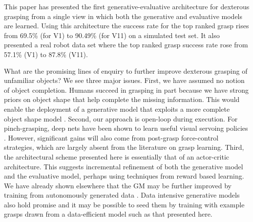 This paper has presented the first generative-evaluative architecture for dexterous grasping from a single view in which both the generative and evaluative models are learned. Using this architecture the success rate for the top ranked grasp rises from 69.5\% (for V1) to 90.49\% (for V11) on a simulated test set. It also presented a real robot data set where the top ranked grasp success rate rose from 57.1\% (V1) to 87.8\% (V11).

What are the promising lines of enquiry to further improve dexterous grasping of unfamiliar objects? We see three major issues. First, we have assumed no notion of object completion. Humans succeed in grasping in part because we have strong priors on object shape that help complete the missing information. This would enable the deployment of a generative model that exploits a more complete object shape model \cite{kopicki2015ijrr}. Second, our approach is open-loop during execution. For pinch-grasping, deep nets have been shown to learn useful visual servoing policies \cite{morrison18}. However, significant gains will also come from post-grasp force-control strategies, which are largely absent from the literature on grasp learning.  Third, the architectural scheme presented here is essentially that of an actor-critic architecture. This suggests incremental refinement of both the generative model and the evaluative model, perhaps using techniques from reward based learning. We have already shown elsewhere that the GM may be further improved by training from autonomously generated data \cite{kopicki2019}. Data intensive generative models also hold promise \cite{veres2017modeling} and it may be possible to seed them by training with example grasps drawn from a data-efficient model such as that presented here.